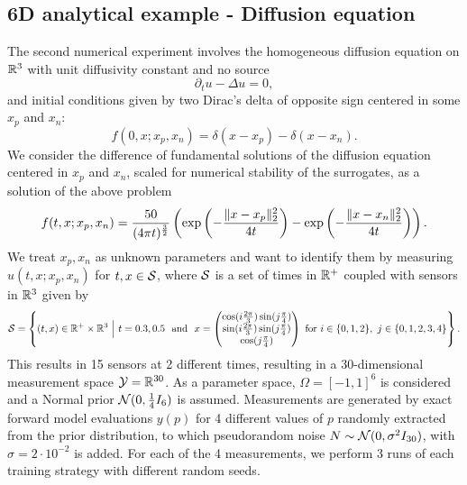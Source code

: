\subsection{6D analytical example - Diffusion equation}\label{sec:6dexp}

The second numerical experiment involves the homogeneous diffusion equation on $\mathbb{R}^3$ with unit diffusivity constant and no source
\[
\partial_t u - \Delta u =0,
\]
and initial conditions given by two Dirac's delta of opposite sign centered in some $x_p$ and $x_n$:
\[
f (0,x; x_p, x_n) = \delta(x-x_p) - \delta(x-x_n).
\]
We consider the difference of fundamental solutions of the diffusion equation centered in $x_p$ and $x_n$, scaled for numerical stability of the surrogates, as a solution of the above problem
\begin{equation}\label{eq:diffusion-solution}
f(t,x; x_p, x_n) = \frac{50}{(4 \pi t)^{\frac{3}{2}}} \left( \exp \left( - \frac{\lVert x-x_p\rVert_2^2}{4t}\right)- \exp \left( - \frac{\lVert x-x_n\rVert_2^2}{4t}\right) \right).
\end{equation}
We treat $x_p, x_n$ as unknown parameters and want to identify them by measuring $u(t,x;x_p, x_n)$ for $t,x \in \mathcal S$, where $\mathcal S$ is a set of times in $\mathbb{R}^+$ coupled with sensors in $\mathbb{R}^3$ given by
\[
\mc S  = \left\{ (t,x) \in \R^+ \times \R^3 \ \Big| \ t = 0.3, 0.5 \ \text{ and } \ x = \begin{pmatrix}
            \cos( i \frac{2\pi}{3}) \sin( j \frac{\pi}{4}) \\
            \sin( i \frac{2\pi}{3}) \sin( j \frac{\pi}{4}) \\ 
            \cos( j \frac{\pi}{4})
        \end{pmatrix} 
         \text{ for } i \in \{0,1,2\}, \ j \in \{0,1,2,3,4\}
        \right\}.         
\]
This results in 15 sensors at 2 different times, resulting in a 30-dimensional measurement space $\mathcal Y = \mathbb{R}^{30}$. \newline
As a parameter space, $\Omega = [-1,1]^6$ is considered and a Normal prior $\mathcal N (0, \frac{1}{4}I_6)$ is assumed.
Measurements are generated by exact forward model evaluations $y(p)$ for 4 different values of $p$ randomly extracted from the prior distribution, to which pseudorandom noise $N \sim \mathcal N (0, \sigma^2 I_{30})$, with $\sigma = 2 \cdot 10^{-2}$ is added.
For each of the 4 measurements, we perform 3 runs of each training strategy with different random seeds. \medskip

